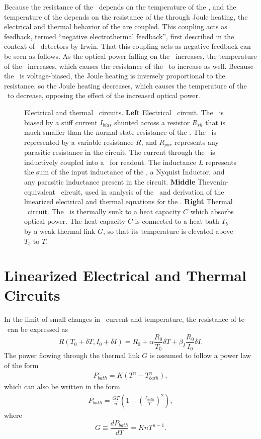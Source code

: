 Because the resistance of the \TES\ depends on the temperature of the \TES, and the temperature of the \TES depends on the resistance of the \TES through Joule heating, the electrical and thermal behavior of the \TES are coupled.
This coupling acts as feedback, termed ``negative electrothermal feedback'', first described in the context of \TES\ detectors by Irwin\cite{irwin1995application}.
That this coupling acts as negative feedback can be seen as follows.
As the optical power falling on the \TES\ increases, the temperature of the \TES\ increases, which causes the resistance of the \TES\ to increase as well.
Because the \TES\ is voltage-biased, the Joule heating is inversely proportional to the resistance, so the Joule heating decreases, which causes the temperature of the \TES\ to decrease, opposing the effect of the increased optical power.

\begin{figure*}
%
\caption{Electrical and thermal \TES\ circuits.
\textbf{Left} Electrical \TES\ circuit.
The \TES\ is biased by a stiff current $I_{bias}$ shunted across a resistor $R_{sh}$ that is much smaller than the normal-state resistance of the \TES.
The \TES\ is represented by a variable resistance $R$, and $R_{par}$ represents any parasitic resistance in the circuit.
The current through the \TES\ is inductively coupled into a \SQUID\ for readout.
The inductance $L$ represents the sum of the input inductance of the \SQUID, a Nyquist Inductor, and any parasitic inductance present in the circuit.
\textbf{Middle} Thevenin-equivalent \TES\ circuit, used in analysis of the \TES\ and derivation of the linearized electrical and thermal equations for the \TES.
\textbf{Right} Thermal \TES\ circuit. The \TES\ is thermally sunk to a heat capacity $C$ which absorbs optical power. The heat capacity $C$ is connected to a heat bath $T_b$ by a weak thermal link $G$, so that its temperature is elevated above $T_b$ to $T$.}
\label{fig:elec-thermal-circuit}
\end{figure*}

\section{Linearized Electrical and Thermal Circuits}

In the limit of small changes in \TES\ current and temperature, the resistance of te \TES\ can be expressed as
\begin{equation}
R(T_0+\delta T,I_0+\delta I) = R_0 + \alpha \frac{R_0}{T_0} \delta T + %
									 \beta_I \frac{R_0}{I_0} \delta I.
\end{equation}
The power flowing through the thermal link $G$ is assumed to follow a power law of the form
\begin{eqnarray}
P_{bath} = K(T^n - T^n_{bath}),
\end{eqnarray}
which can also be written in the form
\begin{eqnarray}
P_{bath} = \frac{GT}{n}\left(1 - \left(\frac{T_{bath}}{T}\right)^2\right),
\end{eqnarray}
where
\begin{equation}
G \equiv \frac{d P_{bath}}{dT} = K n T^{n-1}.
\end{equation}

